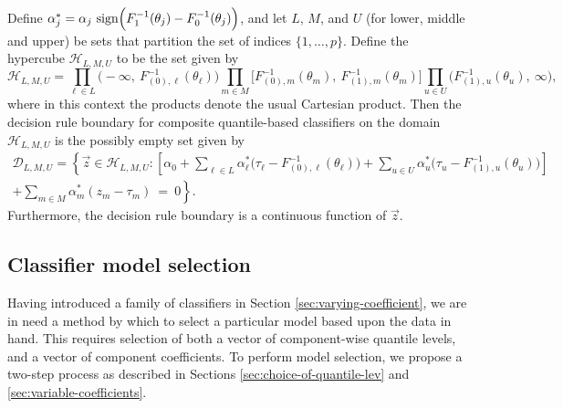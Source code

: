 \begin{proposition}
  \label{lem:decision-rule-form}
  Define
  $\alpha_j^{*} = \alpha_j\, \operatorname{sign}\!\Big(F_1^{-1}(\theta_j) -
  F_0^{-1}(\theta_j)\Big)$, and let $L$, $M$, and $U$ (for lower, middle and
  upper) be sets that partition the set of indices $\{1, \dots, p\}$.  Define
  the hypercube $\mathcal{H}_{L,M,U}$ to be the set given by
  \begin{equation}
    \mathcal{H}_{L,M,U} = 
    \prod_{{\ell} \in L} \big( -\infty,~ F_{(0),{\ell}}^{-1}(\theta_{\ell}) \big)
    \prod_{m \in M} \big[ F_{(0),m}^{-1}(\theta_m),~ F_{(1),m}^{-1}(\theta_m) \big]
    \prod_{u \in U} \big( F_{(1),u}^{-1}(\theta_{u}),~ \infty \big),
  \end{equation}
  where in this context the products denote the usual Cartesian product.  Then
  the decision rule boundary for composite quantile-based classifiers on the
  domain $\mathcal{H}_{L,M,U}$ is the possibly empty set given by
  \begin{equation}
    \label{eq:composite-classifiers-general}
    \begin{split}
      \mathcal{D}_{L,M,U} = \left\{
        \vec{z} \in \mathcal{H}_{L,M,U}:
        \left[
          \alpha_0 + 
          \sum_{{\ell} \in L} \alpha_{\ell}^{*} \Big(\tau_{\ell} - F_{(0),{\ell}}^{-1}(\theta_{\ell})\Big) +
          \sum_{u \in U} \alpha_{u}^{*} \Big(\tau_{u} - F_{(1),u}^{-1}(\theta_{u})\Big)
        \right]
      \right. \\[1ex]
      \left.
        + \sum_{m \in M} \alpha_m^{*} (z_m - \tau_m) ~=~ 0
      \right\} .
    \end{split}
  \end{equation}
  Furthermore, the decision rule boundary is a continuous function of $\vec{z}$.
  
\end{proposition}




\subsection{Classifier model selection}
\label{sec:model-selection}

Having introduced a family of classifiers in Section
\ref{sec:varying-coefficient}, we are in need a method by which to select a
particular model based upon the data in hand.  This requires selection of both a
vector of component-wise quantile levels, and a vector of component
coefficients.  To perform model selection, we propose a two-step process as
described in Sections \ref{sec:choice-of-quantile-lev} and
\ref{sec:variable-coefficients}.




